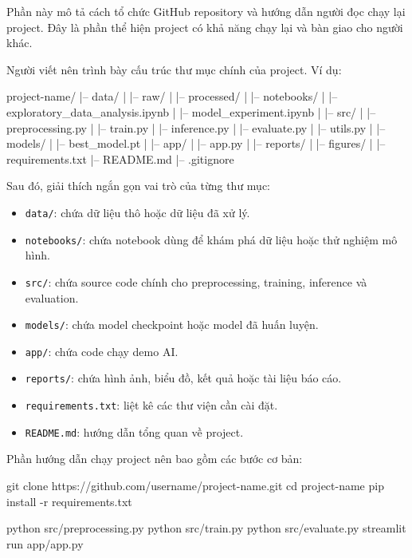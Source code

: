 \documentclass[12pt]{ai_conquer2026}
\begin{document}
Phần này mô tả cách tổ chức GitHub repository và hướng dẫn người đọc chạy lại project. Đây là phần thể hiện project có khả năng chạy lại và bàn giao cho người khác.

Người viết nên trình bày cấu trúc thư mục chính của project. Ví dụ:

\newpage
\begin{aivnoutputbox}
project-name/
|-- data/
|   |-- raw/
|   |-- processed/
|
|-- notebooks/
|   |-- exploratory_data_analysis.ipynb
|   |-- model_experiment.ipynb
|
|-- src/
|   |-- preprocessing.py
|   |-- train.py
|   |-- inference.py
|   |-- evaluate.py
|   |-- utils.py
|
|-- models/
|   |-- best_model.pt
|
|-- app/
|   |-- app.py
|
|-- reports/
|   |-- figures/
|
|-- requirements.txt
|-- README.md
|-- .gitignore

\end{aivnoutputbox}

Sau đó, giải thích ngắn gọn vai trò của từng thư mục:

\begin{itemize}
\item \texttt{data/}: chứa dữ liệu thô hoặc dữ liệu đã xử lý.
\item \texttt{notebooks/}: chứa notebook dùng để khám phá dữ liệu hoặc thử nghiệm mô hình.
\item \texttt{src/}: chứa source code chính cho preprocessing, training, inference và evaluation.
\item \texttt{models/}: chứa model checkpoint hoặc model đã huấn luyện.
\item \texttt{app/}: chứa code chạy demo AI.
\item \texttt{reports/}: chứa hình ảnh, biểu đồ, kết quả hoặc tài liệu báo cáo.
\item \texttt{requirements.txt}: liệt kê các thư viện cần cài đặt.
\item \texttt{README.md}: hướng dẫn tổng quan về project.
\end{itemize}

Phần hướng dẫn chạy project nên bao gồm các bước cơ bản:

\begin{aivncodebox}
\begin{python}
git clone https://github.com/username/project-name.git
cd project-name
pip install -r requirements.txt

python src/preprocessing.py
python src/train.py
python src/evaluate.py
streamlit run app/app.py
\end{python}
\end{aivncodebox}
\end{document}
